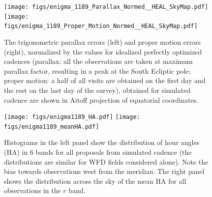 \begin{figure}[t!]
\vskip -0.0in
\texttt{[image: figs/enigma\_1189\_Parallax\_Normed\_\_HEAL\_SkyMap.pdf]}
\texttt{[image: figs/enigma\_1189\_Proper\_Motion\_Normed\_\_HEAL\_SkyMap.pdf]}
\vskip -0.1in
\caption{The trigonometric parallax errors (left) and proper motion errors (right), normalized
by the values for idealized perfectly optimized cadences (parallax: all the observations are taken
at maximum parallax factor, resulting in a peak at the South Ecliptic pole; proper motion:
a half of all visits are obtained on the first day and the rest on the last day of the survey),
obtained for simulated cadence  are shown in Aitoff projection of equatorial
coordinates.}
\label{fig:parapmenigma}
\end{figure}

\begin{figure}[t!]
\vskip -0.2in
\texttt{[image: figs/enigma1189\_HA.pdf]}
\texttt{[image: figs/enigma1189\_meanHA.pdf]}
\vskip -0.3in
\caption{Histograms in the left panel show the distribution of hour angles (HA) in
6 bands for all proposals from simulated cadence  (the distributions are
similar for WFD fields considered alone). Note the bias towards observations west from
the meridian. The right panel shows the distribution across the sky of the mean HA for
all observations in the $r$ band. }
\label{fig:HAenigma}
\end{figure}


